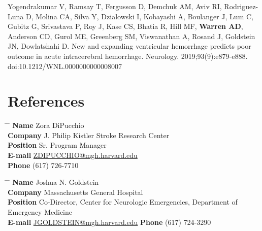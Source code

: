 \documentclass[10pt]{article} %
\begin{document}
\begin{thebibliography}{99}
 Yogendrakumar V, Ramsay T, Fergusson D, Demchuk AM, Aviv RI, Rodriguez-Luna D, Molina CA, Silva Y, Dzialowski I, Kobayashi A, Boulanger J, Lum C, Gubitz G, Srivastava P, Roy J, Kase CS, Bhatia R, Hill MF, \textbf{Warren AD}, Anderson CD, Gurol ME, Greenberg SM, Viswanathan A, Rosand J, Goldstein JN, Dowlatshahi D. New and expanding ventricular hemorrhage predicts poor outcome in acute intracerebral hemorrhage. Neurology. 2019;93(9):e879-e888. doi:10.1212/WNL.0000000000008007


\end{thebibliography}


\section{References}

\parbox{0.5\textwidth}{ %
\begin{tabbing}
\hspace{2.75cm} \= \hspace{4cm} \= \kill %
{\bf Name} \> Zora DiPucchio \\ %
{\bf Company} \> J. Philip Kistler Stroke Research Center \\ %
{\bf Position} \> Sr. Program Manager \\ %
{\bf E-mail} \> \href{mailto:ZDIPUCCHIO@mgh.harvard.edu}{ZDIPUCCHIO@mgh.harvard.edu} \\ %
{\bf Phone} \> (617) 726-7710 %


\end{tabbing}}
\hfill %
\parbox{0.5\textwidth}{ %
\begin{tabbing}
\hspace{2.75cm} \= \hspace{4cm} \= \kill %
{\bf Name} \> Joshua N. Goldstein\\ %
{\bf Company} \> Massachusetts General Hospital \\ %
{\bf Position} \> Co-Director, Center for Neurologic Emergencies, Department of Emergency Medicine \\ %
{\bf E-mail} \> \href{mailto:JGOLDSTEIN@mgh.harvard.edu}{JGOLDSTEIN@mgh.harvard.edu} %
{\bf Phone} \> (617) 724-3290 %
\end{tabbing}}

\end{document}
